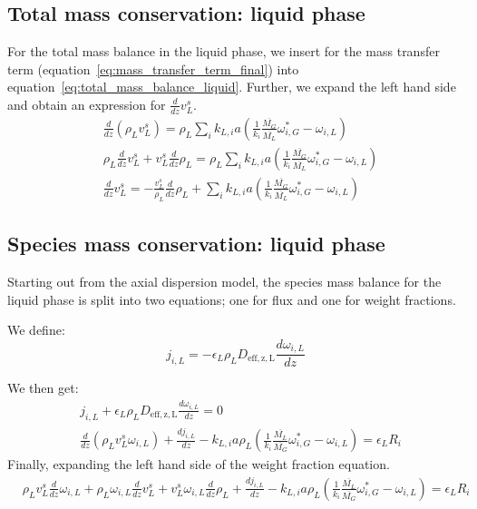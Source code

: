 \documentclass{article}
\begin{document}
\subsection{Total mass conservation: liquid phase}

For the total mass balance in the liquid phase, we insert for the mass transfer term (equation~\ref{eq:mass_transfer_term_final}) into equation~\ref{eq:total_mass_balance_liquid}. Further, we expand the left hand side and obtain an expression for $\frac{d}{dz}v_L^s$.
\begin{equation}
	\begin{split}
	&\frac{d}{dz}\left(\rho_Lv_L^s\right) =\rho_L\sum_ik_{L,i}a(\frac{1}{k_i}\frac{\overline{M_G}}{\overline{M_L}}\omega_{i,G}^*-\omega_{i,L}) \\
	&\rho_L\frac{d}{dz}v_L^s + v_L^s\frac{d}{dz}\rho_L = \rho_L\sum_ik_{L,i}a(\frac{1}{k_i}\frac{\overline{M_G}}{\overline{M_L}}\omega_{i,G}^*-\omega_{i,L}) \\
	&\frac{d}{dz}v_L^s = -\frac{v_L^s}{\rho_L}\frac{d}{dz}\rho_L + \sum_ik_{L,i}a(\frac{1}{k_i}\frac{\overline{M_G}}{\overline{M_L}}\omega_{i,G}^*-\omega_{i,L})
	\label{eq:total_mass_balance_liquid_manipulations}
	\end{split}
\end{equation}

\subsection{Species mass conservation: liquid phase}
Starting out from the axial dispersion model, the species mass balance for the liquid phase is split into two equations; one for flux and one for weight fractions.

We define:
\begin{equation}
	j_{i,L} = - \epsilon_L \rho_L D_{\mathrm{eff,z,L}}\frac{d\omega_{i,L}}{dz}
\end{equation}

We then get:
\begin{equation}
	\begin{split}
	& j_{i,L} + \epsilon_L \rho_L D_{\mathrm{eff,z,L}}\frac{d\omega_{i,L}}{dz} = 0\\
	&\frac{d}{dz}\left(\rho_L v_L^s \omega_{i,L} \right) + \frac{dj_{i,L}}{dz} - k_{L,i}a\rho_L(\frac{1}{k_i}\frac{\overline{M_L}}{\overline{M_G}}\omega_{i,G}^*-\omega_{i,L}) = \epsilon_LR_i 
	\end{split}
\end{equation}
Finally, expanding the left hand side of the weight fraction equation.
	\begin{equation}
	\begin{split}
	&\rho_Lv_L^s\frac{d}{dz}\omega_{i,L} + \rho_L\omega_{i,L} \frac{d}{dz}v_L^s + v_L^s \omega_{i,L} \frac{d}{dz}\rho_L + \frac{dj_{i,L}}{dz} - k_{L,i}a\rho_L(\frac{1}{k_i}\frac{\overline{M_L}}{\overline{M_G}}\omega_{i,G}^*-\omega_{i,L}) = \epsilon_LR_i 
	\end{split}
\end{equation}
\end{document}
